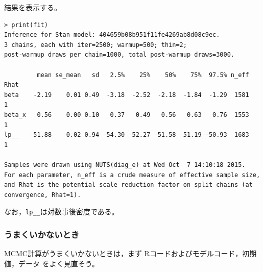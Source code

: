 \documentclass[11pt,uplatex]{jsarticle}
\begin{document}
結果を表示する。
\begin{lstlisting}[basicstyle=\ttfamily\footnotesize]
> print(fit)
Inference for Stan model: 404659b08b951f11fe4269ab8d08c9ec.
3 chains, each with iter=2500; warmup=500; thin=2; 
post-warmup draws per chain=1000, total post-warmup draws=3000.

         mean se_mean   sd   2.5%    25%    50%    75%  97.5% n_eff Rhat
beta    -2.19    0.01 0.49  -3.18  -2.52  -2.18  -1.84  -1.29  1581    1
beta_x   0.56    0.00 0.10   0.37   0.49   0.56   0.63   0.76  1553    1
lp__   -51.88    0.02 0.94 -54.30 -52.27 -51.58 -51.19 -50.93  1683    1

Samples were drawn using NUTS(diag_e) at Wed Oct  7 14:10:18 2015.
For each parameter, n_eff is a crude measure of effective sample size,
and Rhat is the potential scale reduction factor on split chains (at 
convergence, Rhat=1).
\end{lstlisting}
\noindent
なお，\texttt{lp\_\_}は対数事後密度である。

\subsubsection{うまくいかないとき}
MCMC計算がうまくいかないときは，まず \textsf{R}コードおよびモデルコード，初期値，データ
をよく見直そう。
\end{document}
